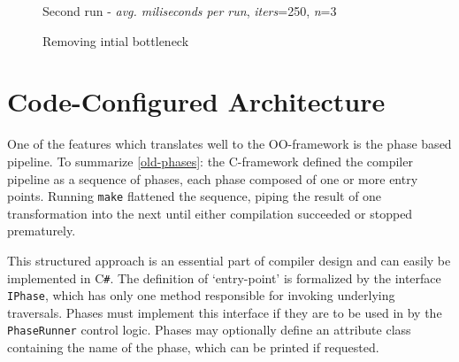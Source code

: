 \documentclass[twoside,openright]{uva-bachelor-thesis}
\newcommand{\code}[1]{\texttt{\footnotesize#1}}
\newcommand{\cs}{C\texttt{\#}\xspace}
\begin{document}
			
			\begin{figure}
				\centering
				\caption{Second run - \emph{avg. miliseconds per run}, \emph{iters}=250, \emph{n}=3}
				\label{fig:second-run}
			\end{figure}
			
			\begin{figure}
				\centering
				\caption{Removing intial bottleneck}
			\end{figure}
					
	
	\section{Code-Configured Architecture}
		One of the features which translates well to the OO-framework is the phase based pipeline. To summarize \cref{old-phases}: the C-framework defined the compiler pipeline as a sequence of phases, each phase composed of one or more entry points. Running \code{make} flattened the sequence, piping the result of one transformation into the next until either compilation succeeded or stopped prematurely.
		
		This structured approach is an essential part of compiler design and can easily be implemented in \cs. The definition of `entry-point' is formalized by the interface \code{IPhase}, which has only one method responsible for invoking underlying traversals. Phases must implement this interface if they are to be used in by the \code{PhaseRunner} control logic. Phases may optionally define an attribute class containing the name of the phase, which can be printed if requested.
		
\end{document}
